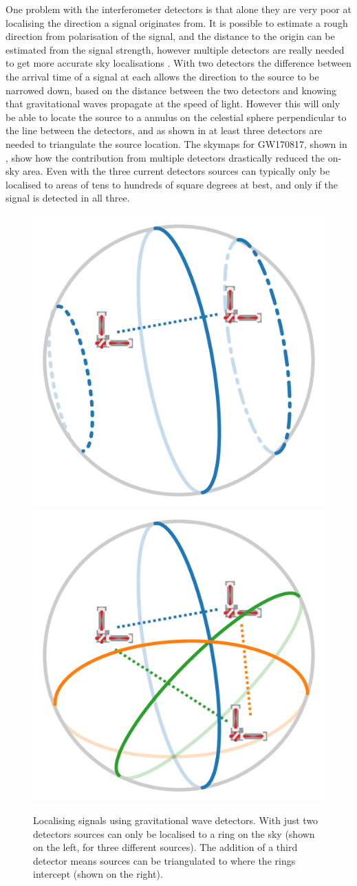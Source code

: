 \begin{colsection}
\begin{colsection}
One problem with the interferometer detectors is that alone they are very poor at localising the direction a signal originates from. It is possible to estimate a rough direction from polarisation of the signal, and the distance to the origin can be estimated from the signal strength, however multiple detectors are really needed to get more accurate sky localisations \citep{GW_localisation, GW_localisation2}. With two detectors the difference between the arrival time of a signal at each allows the direction to the source to be narrowed down, based on the distance between the two detectors and knowing that gravitational waves propagate at the speed of light. However this will only be able to locate the source to a annulus on the celestial sphere perpendicular to the line between the detectors, and as shown in  at least three detectors are needed to triangulate the source location. The skymaps for GW170817, shown in , show how the contribution from multiple detectors drastically reduced the on-sky area. Even with the three current detectors sources can typically only be localised to areas of tens to hundreds of square degrees at best, and only if the signal is detected in all three.

\begin{figure}[t]
    \begin{center}
        \includegraphics[width=0.45\linewidth]{images/triangulate_1.pdf}
        \includegraphics[width=0.45\linewidth]{images/triangulate_2.pdf}
    \end{center}
    \caption[Localising signals using gravitational wave detectors]{
        Localising signals using gravitational wave detectors. With just two detectors sources can only be localised to a ring on the sky (shown on the left, for three different sources). The addition of a third detector means sources can be triangulated to where the rings intercept (shown on the right).
        }\label{fig:triangulate}
\end{figure}


\end{colsection}
\end{colsection}
